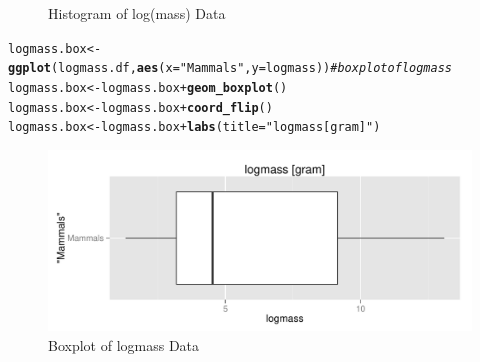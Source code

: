 \documentclass{article}\usepackage[]{graphicx}\usepackage[]{color}
\makeatletter
\def\maxwidth{ %
  \ifdim\Gin@nat@width>\linewidth
    \linewidth
  \else
    \Gin@nat@width
  \fi
}
\newcommand{\hlstr}[1]{\textcolor[rgb]{0.192,0.494,0.8}{#1}}%
\newcommand{\hlcom}[1]{\textcolor[rgb]{0.678,0.584,0.686}{\textit{#1}}}%
\newcommand{\hlopt}[1]{\textcolor[rgb]{0,0,0}{#1}}%
\newcommand{\hlstd}[1]{\textcolor[rgb]{0.345,0.345,0.345}{#1}}%
\newcommand{\hlkwb}[1]{\textcolor[rgb]{0.69,0.353,0.396}{#1}}%
\newcommand{\hlkwc}[1]{\textcolor[rgb]{0.333,0.667,0.333}{#1}}%
\newcommand{\hlkwd}[1]{\textcolor[rgb]{0.737,0.353,0.396}{\textbf{#1}}}%
\newenvironment{kframe}{%
 \def\at@end@of@kframe{}%
 \ifinner\ifhmode%
  \def\at@end@of@kframe{\end{minipage}}%
  \begin{minipage}{\columnwidth}%
 \fi\fi%
 \def\FrameCommand##1{\hskip\@totalleftmargin \hskip-\fboxsep
 \colorbox{shadecolor}{##1}\hskip-\fboxsep
     \hskip-\linewidth \hskip-\@totalleftmargin \hskip\columnwidth}%
 \MakeFramed {\advance\hsize-\width
   \@totalleftmargin\z@ \linewidth\hsize
   \@setminipage}}%
 {\par\unskip\endMakeFramed%
 \at@end@of@kframe}
\newenvironment{knitrout}{}{} %
\makeatother
\begin{document}
\begin{enumerate}
\begin{enumerate}
\begin{figure}[H]
\begin{center}
\begin{knitrout}
\end{knitrout}
\end{center} \vspace{-0.25in}\caption{Histogram of log(mass) Data} \end{figure}

\begin{knitrout}
\color{fgcolor}\begin{kframe}
\begin{alltt}
\hlstd{logmass.box} \hlkwb{<-} \hlkwd{ggplot}\hlstd{(logmass.df,} \hlkwd{aes}\hlstd{(}\hlkwc{x} \hlstd{=} \hlstr{"Mammals"}\hlstd{,} \hlkwc{y} \hlstd{= logmass))} \hlcom{# boxplot of logmass}
\hlstd{logmass.box} \hlkwb{<-} \hlstd{logmass.box} \hlopt{+} \hlkwd{geom_boxplot}\hlstd{()}
\hlstd{logmass.box} \hlkwb{<-} \hlstd{logmass.box} \hlopt{+} \hlkwd{coord_flip}\hlstd{()}
\hlstd{logmass.box} \hlkwb{<-} \hlstd{logmass.box} \hlopt{+} \hlkwd{labs}\hlstd{(}\hlkwc{title} \hlstd{=} \hlstr{"logmass [gram]"}\hlstd{)}
\end{alltt}
\end{kframe}
\end{knitrout}

\begin{figure}[H]  \begin{center}
\begin{knitrout}
\color{fgcolor}
\includegraphics[width=\maxwidth]{figure/4p_box} 

\end{knitrout}
\end{center} \vspace{-0.15in} \caption{Boxplot of logmass Data} \end{figure}


\end{enumerate}
\end{enumerate}
\end{document}
